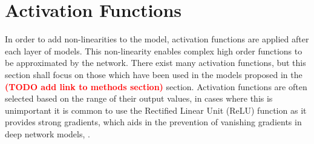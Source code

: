 \section{Activation Functions}
In order to add non-linearities to the model, activation functions are applied after each layer of models.
This non-linearity enables complex high order functions to be approximated by the network.
There exist many activation functions, but this section shall focus on those which have been used in the models proposed in the \textcolor{red}{\textbf{(TODO add link to methods section)}} section.
Activation functions are often selected based on the range of their output values, in cases where this is unimportant it is common to use the Rectified Linear Unit (ReLU) function as it provides strong gradients, which aids in the prevention of vanishing gradients in deep network models, \cite{Goodfellow-et-al-2016}.

